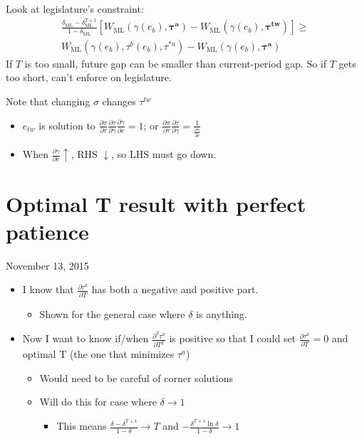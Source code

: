 \documentclass[12pt]{article}
\newcommand{\bta}{\bm{\tau^a}}
\newcommand{\btw}{\bm{\tau^{tw}}}
\newcommand{\ga}{\gamma}
\newcommand{\de}{\delta}
\begin{document}
Look at legislature's constraint:
\begin{multline*}
  \frac{\de_\text{ML} - \de_\text{ML}^{T+1}}{1-\de_\text{ML}} \left[W_\text{ML}(\ga(e_b),\bta) - W_\text{ML}(\ga(e_b),\btw) \right] \geq \\
	W_\text{ML}(\ga(e_b),\tau^b(e_b),\tau^{*a}) - W_\text{ML}(\ga(e_b),\bta)
\end{multline*}
If $T$ is too small, future gap can be smaller than current-period gap. So if $T$ gets too short, can't enforce on legislature.

\vskip1in
Note that changing $\sigma$ changes $\tau^{tw}$
\begin{itemize}
	\item $e_{tw}$ is solution to $\frac{\partial \pi}{\partial \tau}\frac{\partial \tau}{\partial \ga}\frac{\partial \ga}{\partial e} = 1$; or $\frac{\partial \pi}{\partial \tau}\frac{\partial \tau}{\partial \ga} = \frac{1}{\frac{\partial \ga}{\partial e}}$
	\item When $\frac{\partial \ga}{\partial e} \uparrow$, RHS $\downarrow$, so LHS must go down.
\end{itemize}

\newpage
\section{Optimal T result with perfect patience}
November 13, 2015
\begin{itemize}
	\item I know that $\frac{\partial \tau^a}{\partial T}$ has both a negative and positive part.
		\begin{itemize}
			\item Shown for the general case where $\de$ is anything.
		\end{itemize}
	\item Now I want to know if/when $\frac{\partial^2 \tau^a}{\partial T^2}$ is positive so that I could set $\frac{\partial \tau^a}{\partial T} = 0$ and optimal T (the one that minimizes $\tau^a$)
		\begin{itemize}
			\item Would need to be careful of corner solutions
			\item Will do this for case where $\de \rightarrow 1$
				\begin{itemize}
					\item This means $\frac{\de - \de^{T+1}}{1-\de} \rightarrow T$ and $- \frac{\de^{T+1}\ln\de}{1-\de} \rightarrow 1$
				\end{itemize}
		\end{itemize}
\end{itemize}
\end{document}
